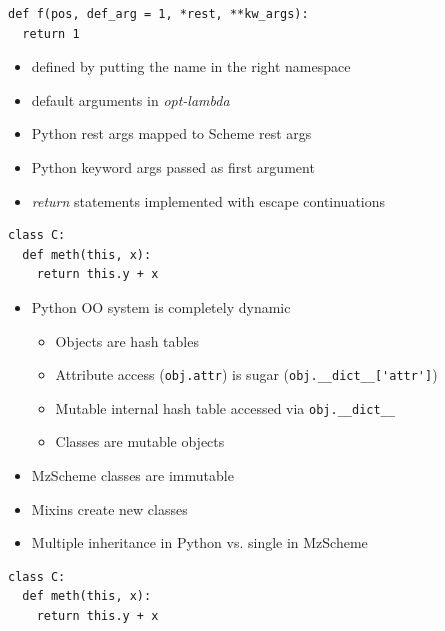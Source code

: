 \documentclass[landscape,20pt,dvips]{foils}
\newcommand{\jhead}[1]{\foilhead{\flushleft \textcolor{vinho}{\large   #1}
\vspace{-0.84cm} \\ {\color{black} --------------------------------------------------------------- }}}
\begin{document}
\jhead{Translations: Functions}
\lstset{language=Python}
\begin{lstlisting}
def f(pos, def_arg = 1, *rest, **kw_args):
  return 1
\end{lstlisting}

  \begin{itemize}
    \item defined by putting the name in the right namespace
    \item default arguments in \emph{opt-lambda}
    \item Python rest args mapped to Scheme rest args
    \item Python keyword args passed as first argument
    \item \emph{return} statements implemented with escape continuations
  \end{itemize}
\jhead{Translations: Classes: Problems}
\begin{lstlisting}
class C:
  def meth(this, x):
    return this.y + x
\end{lstlisting}
  \begin{itemize}
    \item Python OO system is completely dynamic
      \begin{itemize}
        \item Objects are hash tables
        \item Attribute access (\verb|obj.attr|) is sugar (\verb|obj.__dict__['attr']|)
        \item Mutable internal hash table accessed via \verb|obj.__dict__|
        \item Classes are mutable objects
      \end{itemize}
    \item MzScheme classes are immutable
    \item Mixins create new classes
    \item Multiple inheritance in Python vs. single in MzScheme
  \end{itemize}
\jhead{Translations: Classes: Solution}

\begin{lstlisting}
class C:
  def meth(this, x):
    return this.y + x
\end{lstlisting}
\end{document}
